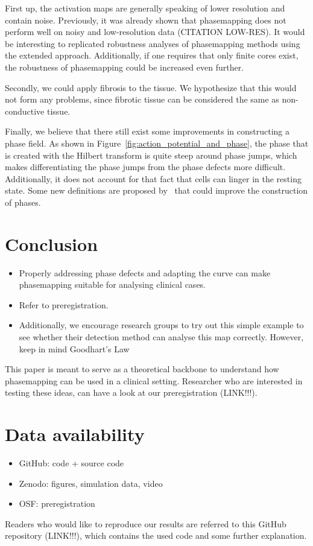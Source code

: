 \documentclass[twocolumn]{article}
\begin{document}
First up, the activation maps are generally speaking of lower resolution
and contain noise.
Previously, it was already shown that phasemapping does not perform well on
noisy and low-resolution data \autocite{lootens2024directed} (CITATION LOW-RES).
It would be interesting to replicated robustness analyses of
phasemapping methods using the extended approach.
Additionally, if one requires that only finite cores exist,
the robustness of phasemapping could be increased even further.

Secondly, we could apply fibrosis to the tissue.
We hypothesize that this would not form any problems,
since fibrotic tissue can be considered the same as non-conductive tissue.

Finally, we believe that there still exist some improvements in
constructing a phase field.
As shown in Figure~\ref{fig:action_potential_and_phase},
the phase that is created with the Hilbert transform is quite steep
around phase jumps,
which makes differentiating the phase jumps from the phase defects
more difficult.
Additionally, it does not account for that fact that cells can linger
in the resting state.
Some new definitions are proposed by~\cite{kabus2022numerical} that
could improve the construction of phases.

\section{Conclusion}\label{conclusion}

\begin{itemize}
    \tightlist
  \item
    Properly addressing phase defects and adapting the curve can make
    phasemapping suitable for analysing clinical cases.
  \item
    Refer to preregistration.
  \item
    Additionally, we encourage research groups to try out this simple
    example to see whether their detection method can analyse this map
    correctly. However, keep in mind Goodhart's Law
\end{itemize}

This paper is meant to serve as a theoretical backbone to understand how
phasemapping can be used in a clinical setting. Researcher who are
interested in testing these ideas, can have a look at our
preregistration (LINK!!!).

\section{Data availability}\label{data-availability}

\begin{itemize}
    \tightlist
  \item
    GitHub: code + source code
  \item
    Zenodo: figures, simulation data, video
  \item
    OSF: preregistration
\end{itemize}

Readers who would like to reproduce our results are referred to this
GitHub repository (LINK!!!), which contains the used code and some
further explanation.

\printbibliography
\end{document}
